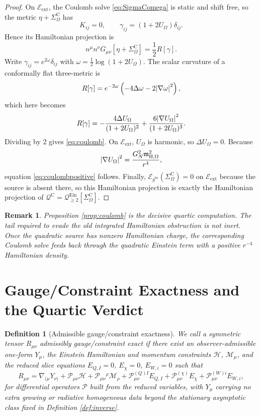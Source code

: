\documentclass[11pt]{article}
\newcommand{\ReBridge}{g^{\mathrm{br}}}
\newcommand{\SigmaC}{\Sigma^{\mathrm{C}}}
\newcommand{\EinLin}{\mathcal E_{\ReBridge}}
\newcommand{\EinQuad}{\mathcal Q_{\ge 2}^{\mathrm{Ein}}}
\newcommand{\HamChargeOmega}{\mathfrak m_{\mathrm H,\Omega}}
\newcommand{\Exterior}{\mathcal E_{\mathrm{ext}}}
\newtheorem{definition}{Definition}
\newtheorem{remark}{Remark}
\begin{document}
\begin{proof}
On \(\Exterior\), the Coulomb solve \eqref{eq:SigmaComega} is static and shift free, so the metric \(\eta+\SigmaC_\Omega\) has
\[
K_{ij}=0,
\qquad
\gamma_{ij}=(1+2U_\Omega)\delta_{ij}.
\]
Hence its Hamiltonian projection is
\[
n^\mu n^\nu G_{\mu\nu}[\eta+\SigmaC_\Omega]
=
\frac12 R[\gamma].
\]
Write \(\gamma_{ij}=e^{2\omega}\delta_{ij}\) with \(\omega=\frac12\log(1+2U_\Omega)\). The scalar curvature of a conformally flat three-metric is
\[
R[\gamma]
=
e^{-2\omega}
\left(
-4\Delta\omega
-2\abs{\nabla\omega}^2
\right),
\]
which here becomes
\[
R[\gamma]
=
-\frac{4\Delta U_\Omega}{(1+2U_\Omega)^2}
+\frac{6\abs{\nabla U_\Omega}^2}{(1+2U_\Omega)^3}.
\]
Dividing by \(2\) gives \eqref{eq:coulomb}. On \(\Exterior\), \(U_\Omega\) is harmonic, so \(\Delta U_\Omega=0\). Because
\[
\abs{\nabla U_\Omega}^2
=
\frac{G_N^2\HamChargeOmega^2}{r^4},
\]
equation \eqref{eq:coulombpositive} follows. Finally, \(\EinLin(\SigmaC_\Omega)=0\) on \(\Exterior\) because the source is absent there, so this Hamiltonian projection is exactly the Hamiltonian projection of \(\mathcal Q^{\mathrm C}=\EinQuad[\SigmaC_\Omega]\).
\end{proof}

\begin{remark}
Proposition \ref{prop:coulomb} is the decisive quartic computation. The tail required to evade the old integrated Hamiltonian obstruction is not inert. Once the quadratic source has nonzero Hamiltonian charge, the corresponding Coulomb solve feeds back through the quadratic Einstein term with a positive \(r^{-4}\) Hamiltonian density.
\end{remark}

\section{Gauge/Constraint Exactness and the Quartic Verdict}

\begin{definition}[Admissible gauge/constraint exactness]
\label{def:pure}
We call a symmetric tensor \(R_{\mu\nu}\) \emph{admissibly gauge/constraint exact} if there exist an observer-admissible one-form \(Y_\mu\), the Einstein Hamiltonian and momentum constraints \(\mathcal H\), \(\mathcal M_\mu\), and the reduced slice equations \(E_{Q,I}=0\), \(E_\chi=0\), \(E_{W,i}=0\) such that
\begin{equation}
R_{\mu\nu}
=
\nabla_{(\mu}Y_{\nu)}
+\mathcal P_{\mu\nu}\mathcal H
+\mathcal P_{\mu\nu}{}^\rho \mathcal M_\rho
+\mathcal P_{\mu\nu}^{(Q)I}E_{Q,I}
+\mathcal P_{\mu\nu}^{(\chi)}E_\chi
+\mathcal P_{\mu\nu}^{(W)i}E_{W,i},
\label{eq:pure}
\end{equation}
for differential operators \(\mathcal P\) built from the reduced variables, with \(Y_\mu\) carrying no extra growing or radiative homogeneous data beyond the stationary asymptotic class fixed in Definition \ref{def:inverse}.
\end{definition}
\end{document}
